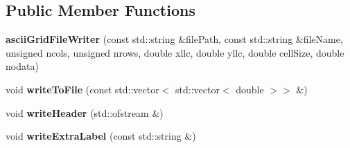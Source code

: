 \subsection*{Public Member Functions}
\begin{DoxyCompactItemize}
\item 
\mbox{\label{classasciiGridFileWriter_afeacb4d025b8ec4c81df40267669f393}} 
{\bfseries ascii\+Grid\+File\+Writer} (const std\+::string \&file\+Path, const std\+::string \&file\+Name, unsigned ncols, unsigned nrows, double xllc, double yllc, double cell\+Size, double nodata)
\item 
\mbox{\label{classasciiGridFileWriter_aeec3b86649e3f8b0a2ee28bfa9c29790}} 
void {\bfseries write\+To\+File} (const std\+::vector$<$ std\+::vector$<$ double $>$$>$ \&)
\item 
\mbox{\label{classasciiGridFileWriter_a9194aed7b3c3f7e388db61a1ea057404}} 
void {\bfseries write\+Header} (std\+::ofstream \&)
\item 
\mbox{\label{classasciiGridFileWriter_ae1ca7a5a88f2d22e577e767c1b7d3c27}} 
void {\bfseries write\+Extra\+Label} (const std\+::string \&)
\end{DoxyCompactItemize}
